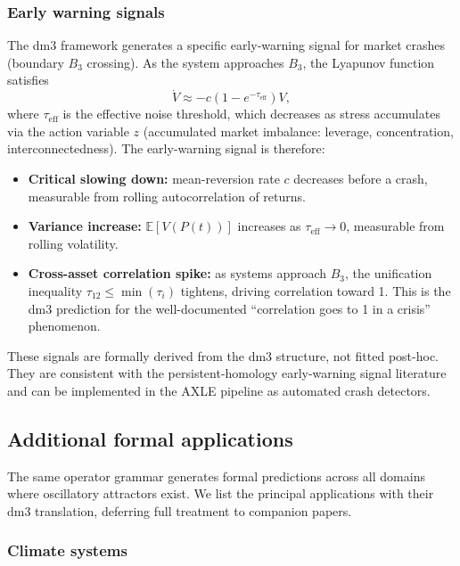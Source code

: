 \subsubsection{Early warning signals}

The dm3 framework generates a specific early-warning signal
for market crashes (boundary $B_3$ crossing). As the system
approaches $B_3$, the Lyapunov function satisfies
\[
  \dot{V} \approx -c(1 - e^{-\tau_{\mathrm{eff}}}) V,
\]
where $\tau_{\mathrm{eff}}$ is the effective noise threshold,
which decreases as stress accumulates via the action variable
$z$ (accumulated market imbalance: leverage, concentration,
interconnectedness). The early-warning signal is therefore:

\begin{itemize}
  \item \textbf{Critical slowing down:} mean-reversion rate
    $c$ decreases before a crash, measurable from rolling
    autocorrelation of returns.
  \item \textbf{Variance increase:} $\mathbb{E}[V(P(t))]$
    increases as $\tau_{\mathrm{eff}} \to 0$, measurable
    from rolling volatility.
  \item \textbf{Cross-asset correlation spike:} as systems
    approach $B_3$, the unification inequality
    $\tau_{12} \le \min(\tau_i)$ tightens, driving
    correlation toward 1. This is the dm3 prediction for
    the well-documented ``correlation goes to 1 in a crisis''
    phenomenon.
\end{itemize}

These signals are formally derived from the dm3 structure,
not fitted post-hoc. They are consistent with the persistent-homology
early-warning signal literature \cite{Ismail2022} and can be
implemented in the AXLE pipeline as automated crash detectors.

\subsection{Additional formal applications}

The same operator grammar generates formal predictions across
all domains where oscillatory attractors exist. We list the
principal applications with their dm3 translation, deferring
full treatment to companion papers.

\subsubsection{Climate systems}

